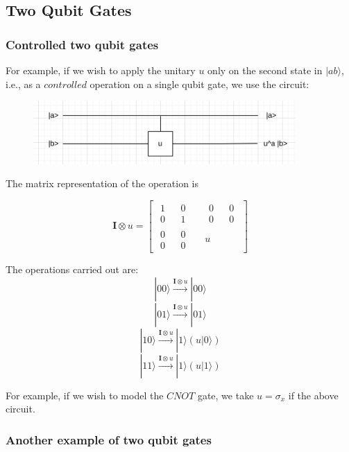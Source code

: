 \documentclass{article}
\begin{document}
\subsection{Two Qubit Gates}

\subsubsection{Controlled two qubit gates}

For example, if we wish to apply the unitary $u$ only on the second state in $|ab\rangle$, i.e., as a $controlled$ operation on a single qubit gate, we use the circuit:

\begin{figure}[htp]
	\centering
	\includegraphics[width=10cm]{twoqubit.png}
\end{figure}

The matrix representation of the operation is

$$
	\mathbf{I} \otimes u = \begin{bmatrix}
		\begin{matrix}
			1 &  & 0 \\
			0 &  & 1
		\end{matrix}
		 &  &
		\begin{matrix}
			0 &  & 0 \\
			0 &  & 0
		\end{matrix}
		\\
		\begin{matrix}
			0 &  & 0 \\
			0 &  & 0
		\end{matrix}
		 &  &
		u
	\end{bmatrix}
$$

The operations carried out are:
$$|00\rangle \xrightarrow[]{\mathbf{I} \otimes u} |00\rangle$$
$$|01\rangle \xrightarrow[]{\mathbf{I} \otimes u} |01\rangle$$
$$|10\rangle \xrightarrow[]{\mathbf{I} \otimes u} |1\rangle(u|0\rangle)$$
$$|11\rangle \xrightarrow[]{\mathbf{I} \otimes u} |1\rangle(u|1\rangle)$$

For example, if we wish to model the $CNOT$ gate, we take $u=\sigma _x$ if the above circuit.

\subsubsection{Another example of two qubit gates}
\end{document}
